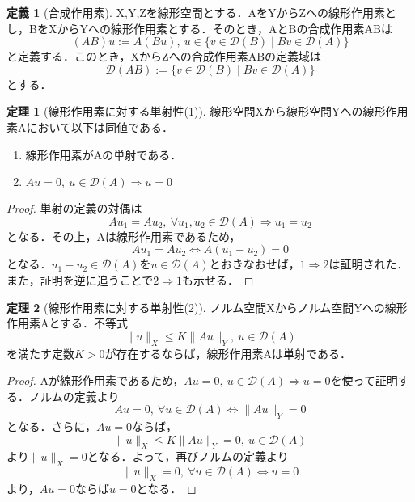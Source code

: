 \documentclass[11pt,a4paper]{jsarticle}
\theoremstyle{definition}
\newtheorem{dfn}{定義}
\newtheorem{thm}{定理}
\begin{document}
\begin{dfn}[合成作用素]
  \label{dfn:合成作用素}
  X,Y,Zを線形空間とする．AをYからZへの線形作用素とし，BをXからYへの線形作用素とする．そのとき，AとBの合成作用素ABは
  \begin{equation*}
    (AB)u:=A(Bu),\ u\in\{v\in\mathcal{D}(B)\mid Bv\in\mathcal{D}(A)\}
  \end{equation*}
  と定義する．このとき，XからZへの合成作用素ABの定義域は
  \begin{equation*}
    \mathcal{D}(AB):=\{v\in\mathcal{D}(B)\mid Bv\in\mathcal{D}(A)\}
  \end{equation*}
  とする．
\end{dfn}

\begin{thm}[線形作用素に対する単射性(1)]
  \label{thm:線形作用素に対する単射性(1)}
  線形空間Xから線形空間Yへの線形作用素Aにおいて以下は同値である．
  \begin{enumerate}
    \item 線形作用素がAの単射である．
    \item $Au=0,\ u\in\mathcal{D}(A)\Rightarrow u=0$
  \end{enumerate}
\end{thm}

\begin{proof}
  単射の定義の対偶は
  \begin{equation*}
    Au_1 = Au_2,\ \forall u_1,u_2\in\mathcal{D}(A)\Rightarrow u_1=u_2
  \end{equation*}
  となる．その上，Aは線形作用素であるため，
  \begin{equation*}
    Au_1=Au_2\Leftrightarrow A(u_1-u_2)=0
  \end{equation*}
  となる．$u_1-u_2\in\mathcal{D}(A)$を$u\in\mathcal{D}(A)$とおきなおせば，$1\Rightarrow2$は証明された．また，証明を逆に追うことで$2\Rightarrow1$も示せる．
\end{proof}

\begin{thm}[線形作用素に対する単射性(2)]
  ノルム空間Xからノルム空間Yへの線形作用素Aとする．不等式
  \begin{equation*}
    \|u\|_X \leq K\|Au\|_Y,\ u\in\mathcal{D}(A)
  \end{equation*}
  を満たす定数$K>0$が存在するならば，線形作用素Aは単射である．
\end{thm}

\begin{proof}
  Aが線形作用素であるため，$Au=0,\ u\in\mathcal{D}(A)\Rightarrow u=0$を使って証明する．ノルムの定義より
  \begin{equation*}
    Au=0,\ \forall u\in\mathcal{D}(A)\Leftrightarrow\|Au\|_Y=0
  \end{equation*}
  となる．さらに，$Au=0$ならば，
  \begin{equation*}
    \|u\|_X \leq K\|Au\|_Y=0,\ u\in\mathcal{D}(A)
  \end{equation*}
  より$\|u\|_X=0$となる．よって，再びノルムの定義より
  \begin{equation*}
    \|u\|_X=0,\ \forall u\in\mathcal{D}(A)\Leftrightarrow u=0
  \end{equation*}
  より，$Au=0$ならば$u=0$となる．
\end{proof}
\end{document}

